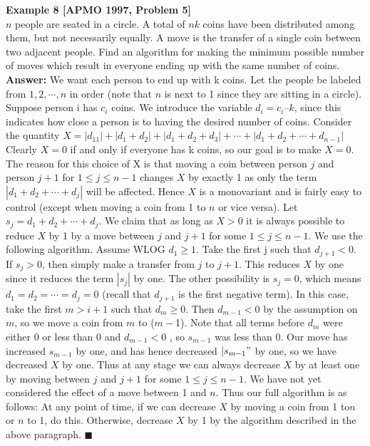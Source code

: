 \documentclass[a4paper,11pt]{book}
\begin{document}
\textbf{Example 8 [APMO 1997, Problem 5]}\\
$n$ people are seated in a circle. A total of $nk$ coins have been
distributed among them, but not necessarily equally. A move is the
transfer of a single coin between two adjacent people. Find an
algorithm for making the minimum possible number of moves
which result in everyone ending up with the same number of
coins.
\textbf{ Answer:}
We want each person to end up with k coins. Let the people be
labeled from $1, 2, \cdots, n$ in order (note that $n$ is next to 1 since they
are sitting in a circle). Suppose person i has $c_i$ coins. We introduce
the variable $d_i = c_i – k$, since this indicates how close a person is to
having the desired number of coins. Consider the quantity
$X = |d_11| + |d_1 + d_2| + |d_1 + d_2 + d_3| + \cdots + |d_1 + d_2 + \cdots + d_{n-1}|$
Clearly $X = 0$ if and only if everyone has k coins, so our goal is to make $X = 0$. The reason for this choice of X is that moving a coin between person $j$ and person $j + 1$ for $1 \le j \le n -1$ changes $X$ by
exactly 1 as only the term $|d_1 + d_2 + \cdots+ d_j|$ will be affected. Hence
$X$ is a monovariant and is fairly easy to control (except when
moving a coin from 1 to $n$ or vice versa). Let $s_j = d_1 + d_2 + \cdots + d_j$.
We claim that as long as $X > 0$ it is always possible to reduce $X$
by 1 by a move between $j$ and $ j +1$ for some $1\le j \le n -1$. We use the
following algorithm. Assume WLOG $d_1 \ge 1$. Take the first j such
that $d_{j+1} < 0$. If $s_j > 0$, then simply make a transfer from $j $ to $j + 1$.
This reduces $X$ by one since it reduces the term $|s_j|$ by one. The
other possibility is $s_j = 0$, which means $d_1 = d_2 = \cdots = d_j =0 $ (recall
that $d_{j+1}$ is the first negative term). In this case, take the first $m >
i+1$ such that $d_m \ge 0$. Then $d_{m-1} < 0 $ by the assumption on $m$, so we
move a coin from $m$ to ($m-$1). Note that all terms before $d_m$ were
either 0 or less than 0 and $d_{m-1} < 0$ , so $s_{m-1}$ was less than 0. Our
move has increased $s_{m-1}$ by one, and has hence decreased $|s_{m-1}"$ by
one, so we have decreased $X$ by one.
Thus at any stage we can always decrease $X$ by at least one by
moving between $j$ and $j +1$ for some $1 \le j \le n -1$. We have not yet
considered the effect of a move between 1 and $n$. Thus our full
algorithm is as follows: At any point of time, if we can decrease $X$
by moving a coin from 1 to$n$ or $n$ to 1, do this. Otherwise, decrease
$X$ by 1 by the algorithm described in the above paragraph. \hfill $\blacksquare$\\
\end{document}
